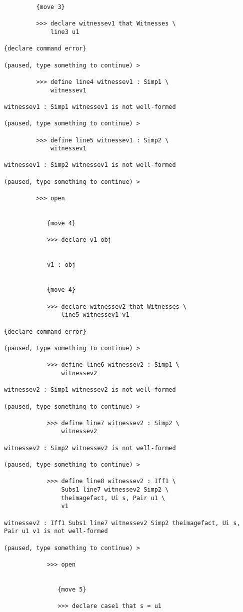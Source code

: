 \documentclass[12pt]{article}
\begin{document}
\begin{verbatim}
         {move 3}

         >>> declare witnessev1 that Witnesses \
             line3 u1

{declare command error}

(paused, type something to continue) >

         >>> define line4 witnessev1 : Simp1 \
             witnessev1

witnessev1 : Simp1 witnessev1 is not well-formed

(paused, type something to continue) >

         >>> define line5 witnessev1 : Simp2 \
             witnessev1

witnessev1 : Simp2 witnessev1 is not well-formed

(paused, type something to continue) >

         >>> open


            {move 4}

            >>> declare v1 obj


            v1 : obj


            {move 4}

            >>> declare witnessev2 that Witnesses \
                line5 witnessev1 v1

{declare command error}

(paused, type something to continue) >

            >>> define line6 witnessev2 : Simp1 \
                witnessev2

witnessev2 : Simp1 witnessev2 is not well-formed

(paused, type something to continue) >

            >>> define line7 witnessev2 : Simp2 \
                witnessev2

witnessev2 : Simp2 witnessev2 is not well-formed

(paused, type something to continue) >

            >>> define line8 witnessev2 : Iff1 \
                Subs1 line7 witnessev2 Simp2 \
                theimagefact, Ui s, Pair u1 \
                v1

witnessev2 : Iff1 Subs1 line7 witnessev2 Simp2 theimagefact, Ui s, Pair u1 v1 is not well-formed

(paused, type something to continue) >

            >>> open


               {move 5}

               >>> declare case1 that s = u1


\end{verbatim}
\end{document}
